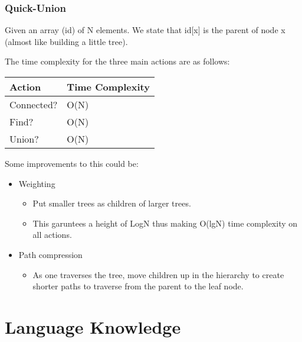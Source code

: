 \documentclass[11pt]{article}
\begin{document}
\subsubsection*{Quick-Union}
\label{sec:orgb50ecc8}
Given an array (id) of N elements. We state that id[x] is the parent of node x (almost like building a little tree).

The time complexity for the three main actions are as follows:
\begin{center}
\begin{tabular}{ll}
Action & Time Complexity\\
\hline
Connected? & O(N)\\
Find? & O(N)\\
Union? & O(N)\\
\end{tabular}
\end{center}

Some improvements to this could be:
\begin{itemize}
\item Weighting
\begin{itemize}
\item Put smaller trees as children of larger trees.
\item This garuntees a height of LogN thus making O(lgN) time complexity on all actions.
\end{itemize}
\item Path compression
\begin{itemize}
\item As one traverses the tree, move children up in the hierarchy to create shorter paths to traverse from the parent to the leaf node.
\end{itemize}
\end{itemize}


\section*{Language Knowledge}
\label{sec:org348267a}
\end{document}
